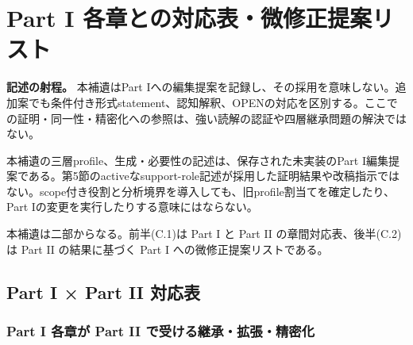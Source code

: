 \section{Part I 各章との対応表・微修正提案リスト}

\noindent\textbf{記述の射程。} 本補遺はPart Iへの編集提案を記録し、その採用を意味しない。追加案でも条件付き形式statement、認知解釈、OPENの対応を区別する。ここでの証明・同一性・精密化への参照は、強い読解の認証や四層継承問題の解決ではない。

本補遺の三層profile、生成・必要性の記述は、保存された未実装のPart I編集提案である。第5節のactiveなsupport-role記述が採用した証明結果や改稿指示ではない。scope付き役割と分析境界を導入しても、旧profile割当てを確定したり、Part Iの変更を実行したりする意味にはならない。



本補遺は二部からなる。前半(C.1)は Part I と Part II の章間対応表、後半(C.2)は Part II の結果に基づく Part I への微修正提案リストである。

\bigskip


\subsection{Part I × Part II 対応表}


\subsubsection{Part I 各章が Part II で受ける継承・拡張・精密化}


